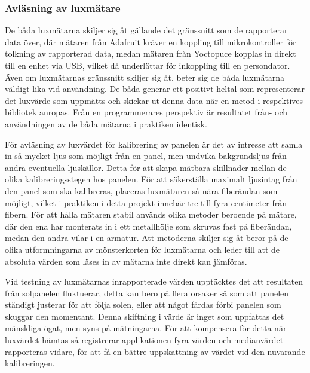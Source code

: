 
        \subsubsection{Avläsning av luxmätare} %
        \label{ssub:avlasning_av_luxmatare}
            De båda luxmätarna skiljer sig åt gällande det gränssnitt som de rapporterar data över, där mätaren från Adafruit kräver en koppling till mikrokontroller för tolkning av rapporterad data, medan mätaren från Yoctopuce kopplas in direkt till en enhet via USB, vilket då underlättar för inkoppling till en persondator. Även om luxmätarnas gränssnitt skiljer sig åt, beter sig de båda luxmätarna väldigt lika vid användning. De båda generar ett positivt heltal som representerar det luxvärde som uppmätts och skickar ut denna data när en metod i respektives bibliotek anropas. Från en programmerares perspektiv är resultatet från- och användningen av de båda mätarna i praktiken identisk.\bigskip

            För avläsning av luxvärdet för kalibrering av panelen är det av intresse att samla in så mycket ljus som möjligt från en panel, men undvika bakgrundsljus från andra eventuella ljuskällor. Detta för att skapa mätbara skillnader mellan de olika kalibreringsstegen hos panelen. För att säkerställa maximalt ljusintag från den panel som ska kalibreras, placeras luxmätaren så nära fiberändan som möjligt, vilket i praktiken i detta projekt innebär tre till fyra centimeter från fibern. För att hålla mätaren stabil används olika metoder beroende på mätare, där den ena har monterats in i ett metallhölje som skruvas fast på fiberändan, medan den andra vilar i en armatur. Att metoderna skiljer sig åt beror på de olika utformningarna av mönsterkorten för luxmätarna och leder till att de absoluta värden som läses in av mätarna inte direkt kan jämföras.\bigskip 

            Vid testning av luxmätarnas inrapporterade värden upptäcktes det att resultaten från solpanelen fluktuerar, detta kan bero på flera orsaker så som att panelen ständigt justerar för att följa solen, eller att något färdas förbi panelen som skuggar den momentant. Denna skiftning i värde är inget som uppfattas det mänskliga ögat, men syns på mätningarna. För att kompensera för detta när luxvärdet hämtas så registrerar applikationen fyra värden och medianvärdet rapporteras vidare, för att få en bättre uppskattning av värdet vid den nuvarande kalibreringen.

